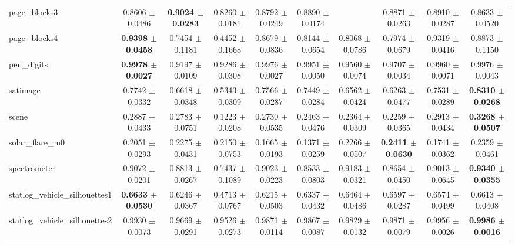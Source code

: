 \begin{table*}[htbp]
{\begin{tabular}{lccccccccc}
            page\_blocks3 & 0.8606 $\pm$ 0.0486 & \cellcolor{graybg}\textbf{0.9024 $\pm$ 0.0283} & 0.8260 $\pm$ 0.0181 & 0.8792 $\pm$ 0.0249 & 0.8890 $\pm$ 0.0174 &  & 0.8871 $\pm$ 0.0263 & 0.8910 $\pm$ 0.0287 & 0.8633 $\pm$ 0.0520 \\ 
            page\_blocks4 & \cellcolor{graybg}\textbf{0.9398 $\pm$ 0.0458} & 0.7454 $\pm$ 0.1181 & 0.4452 $\pm$ 0.1668 & 0.8679 $\pm$ 0.0836 & 0.8144 $\pm$ 0.0654 & 0.8068 $\pm$ 0.0786 & 0.7974 $\pm$ 0.0679 & 0.9319 $\pm$ 0.0416 & 0.8873 $\pm$ 0.1150 \\ 
            pen\_digits & \cellcolor{graybg}\textbf{0.9978 $\pm$ 0.0027} & 0.9197 $\pm$ 0.0109 & 0.9286 $\pm$ 0.0308 & 0.9976 $\pm$ 0.0027 & 0.9951 $\pm$ 0.0050 & 0.9560 $\pm$ 0.0074 & 0.9707 $\pm$ 0.0034 & 0.9960 $\pm$ 0.0071 & 0.9976 $\pm$ 0.0043 \\ 
            satimage & 0.7742 $\pm$ 0.0332 & 0.6618 $\pm$ 0.0348 & 0.5343 $\pm$ 0.0309 & 0.7566 $\pm$ 0.0287 & 0.7449 $\pm$ 0.0284 & 0.6562 $\pm$ 0.0424 & 0.6263 $\pm$ 0.0477 & 0.7531 $\pm$ 0.0289 & \cellcolor{graybg}\textbf{0.8310 $\pm$ 0.0268} \\ 
            scene & 0.2887 $\pm$ 0.0433 & 0.2783 $\pm$ 0.0751 & 0.1223 $\pm$ 0.0208 & 0.2730 $\pm$ 0.0535 & 0.2463 $\pm$ 0.0476 & 0.2364 $\pm$ 0.0309 & 0.2259 $\pm$ 0.0365 & 0.2913 $\pm$ 0.0434 & \cellcolor{graybg}\textbf{0.3268 $\pm$ 0.0507} \\ 
            solar\_flare\_m0 & 0.2051 $\pm$ 0.0293 & 0.2275 $\pm$ 0.0431 & 0.2150 $\pm$ 0.0753 & 0.1665 $\pm$ 0.0193 & 0.1371 $\pm$ 0.0259 & 0.2266 $\pm$ 0.0507 & \cellcolor{graybg}\textbf{0.2411 $\pm$ 0.0630} & 0.1741 $\pm$ 0.0362 & 0.2359 $\pm$ 0.0461 \\ 
            spectrometer & 0.9072 $\pm$ 0.0201 & 0.8813 $\pm$ 0.0267 & 0.7437 $\pm$ 0.1089 & 0.9023 $\pm$ 0.0223 & 0.8533 $\pm$ 0.0803 & 0.9183 $\pm$ 0.0321 & 0.8654 $\pm$ 0.0450 & 0.9013 $\pm$ 0.0645 & \cellcolor{graybg}\textbf{0.9340 $\pm$ 0.0355} \\ 
            statlog\_vehicle\_silhouettes1 & \cellcolor{graybg}\textbf{0.6633 $\pm$ 0.0530} & 0.6246 $\pm$ 0.0367 & 0.4713 $\pm$ 0.0767 & 0.6215 $\pm$ 0.0503 & 0.6337 $\pm$ 0.0432 & 0.6464 $\pm$ 0.0486 & 0.6597 $\pm$ 0.0287 & 0.6574 $\pm$ 0.0499 & 0.6613 $\pm$ 0.0408 \\ 
            statlog\_vehicle\_silhouettes2 & 0.9930 $\pm$ 0.0073 & 0.9669 $\pm$ 0.0291 & 0.9526 $\pm$ 0.0273 & 0.9871 $\pm$ 0.0114 & 0.9867 $\pm$ 0.0087 & 0.9829 $\pm$ 0.0132 & 0.9871 $\pm$ 0.0079 & 0.9956 $\pm$ 0.0026 & \cellcolor{graybg}\textbf{0.9986 $\pm$ 0.0016} \\ 

\end{tabular}}
\end{table*}
